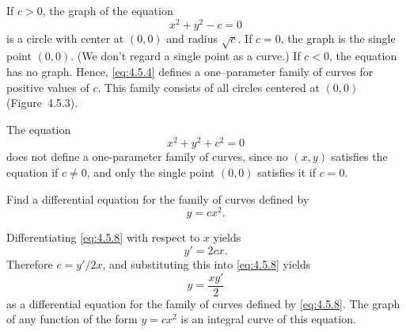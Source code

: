 \setcounter{example}{2}
\setcounter{equation}{3}
\begin{example}
  \label{example:4.5.3} \rm If $c>0$, the graph of the equation
  \begin{equation}
    \label{eq:4.5.4}x^{2}+y^{2}-c=0
  \end{equation}
  is a circle with center at $(0,0)$ and radius $\sqrt{c}$. If $c=0$, the graph is the single point
  $(0,0)$. (We don't regard a single point as a curve.) If $c<0$, the equation has no graph. Hence,
  \eqref{eq:4.5.4} defines a one--parameter family of curves for positive values of $c$. This family
  consists of all circles centered at $(0,0)$ (Figure~4.5.3).
\end{example}

\setcounter{example}{3}
\begin{example}
  \label{example:4.5.4} \rm The equation
  \[
    x^{2}+y^{2}+c^{2}=0
  \]
  does not define a one-parameter family of curves, since no $(x,y)$ satisfies the equation if
  $c\ne0$, and only the single point $(0,0)$ satisfies it if $c=0$. \bbox
\end{example}

\setcounter{example}{4}
\setcounter{equation}{7}
\begin{example}
  \label{example:4.5.5} \rm Find a differential equation for the family of curves defined by
  \begin{equation}
    \label{eq:4.5.8}y=cx^{2}.
  \end{equation}
\end{example}
\begin{examplesolution}
\solution Differentiating \eqref{eq:4.5.8} with respect to $x$ yields
\[
  y'=2cx.
\]
Therefore $c=y'/2x$, and substituting this into \eqref{eq:4.5.8} yields
\[
  y=\frac{xy'}{2}
\]
as a differential equation for the family of curves defined by \eqref{eq:4.5.8}. The graph of any
function of the form $y=cx^{2}$ is an integral curve of this equation. \bbox
\end{examplesolution}

